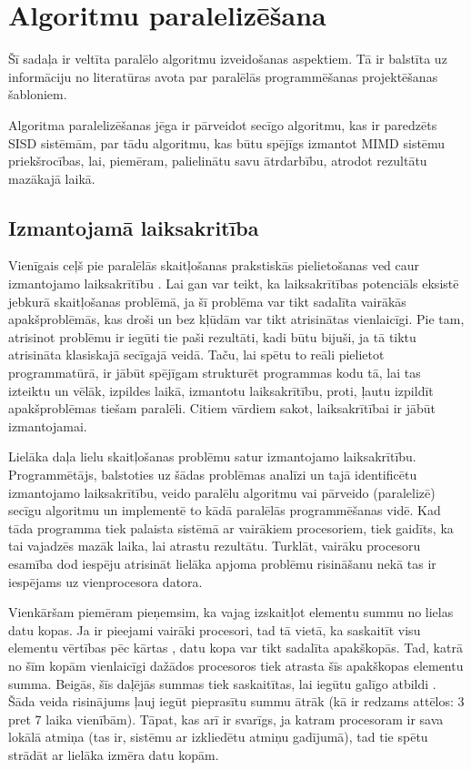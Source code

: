 
\section{Algoritmu paralelizēšana}
Šī sadaļa ir veltīta paralēlo algoritmu izveidošanas aspektiem. Tā ir
balstīta uz informāciju no literatūras avota \cite{PatParProg} par paralēlās
programmēšanas projektēšanas šabloniem.

Algoritma paralelizēšanas jēga ir pārveidot secīgo algoritmu, kas ir paredzēts
SISD sistēmām, par tādu algoritmu, kas būtu spējīgs izmantot MIMD sistēmu
priekšrocības, lai, piemēram, palielinātu savu ātrdarbību, atrodot rezultātu
mazākajā laikā.

\subsection{Izmantojamā laiksakritība}
Vienīgais ceļš pie paralēlās skaitļošanas prakstiskās pielietošanas ved caur
izmantojamo laiksakrītību . Lai gan var teikt, ka
laiksakrītības potenciāls eksistē jebkurā skaitļošanas problēmā, ja šī problēma
var tikt sadalīta vairākās apakšproblēmās, kas droši un bez kļūdām var tikt
atrisinātas vienlaicīgi. Pie tam, atrisinot problēmu ir iegūti tie
paši rezultāti, kadi būtu bijuši, ja tā tiktu atrisināta klasiskajā secīgajā
veidā. Taču, lai spētu to reāli pielietot programmatūrā, ir jābūt spējīgam
strukturēt programmas kodu tā, lai tas izteiktu un vēlāk, izpildes laikā,
izmantotu laiksakrītību, proti, ļautu izpildīt apakšproblēmas tiešam paralēli.
Citiem vārdiem sakot, laiksakrītībai ir jābūt izmantojamai.

Lielāka daļa lielu skaitļošanas problēmu satur izmantojamo laiksakrītību.
Programmētājs, balstoties uz šādas problēmas analīzi un tajā
identificētu izmantojamo laiksakrītību, veido paralēlu algoritmu vai pārveido
(paralelizē) secīgu algoritmu un implementē to kādā paralēlās programmēšanas vidē.
Kad tāda programma tiek palaista sistēmā ar vairākiem procesoriem, tiek gaidīts,
ka tai vajadzēs mazāk laika, lai atrastu rezultātu. Turklāt, vairāku procesoru
esamība dod iespēju atrisināt lielāka apjoma problēmu risināšanu nekā tas
ir iespējams uz vienprocesora datora.

Vienkāršam piemēram pieņemsim, ka vajag izskaitļot elementu summu no lielas
datu kopas. Ja ir pieejami vairāki procesori, tad tā vietā, ka saskaitīt
visu elementu vērtības pēc kārtas , datu kopa var tikt sadalīta apakškopās.
Tad, katrā no šīm kopām vienlaicīgi dažādos procesoros tiek atrasta šīs
apakškopas elementu summa. Beigās, šīs daļējās summas tiek saskaitītas,
lai iegūtu galīgo atbildi . Šāda veida risinājums ļauj iegūt pieprasītu
summu ātrāk (kā ir redzams attēlos: 3 pret 7 laika vienībām). Tāpat, kas arī ir svarīgs,
ja katram procesoram ir sava lokālā atmiņa
(tas ir, sistēmu ar izkliedētu atmiņu gadījumā), tad tie spētu strādāt ar
lielāka izmēra datu kopām.

